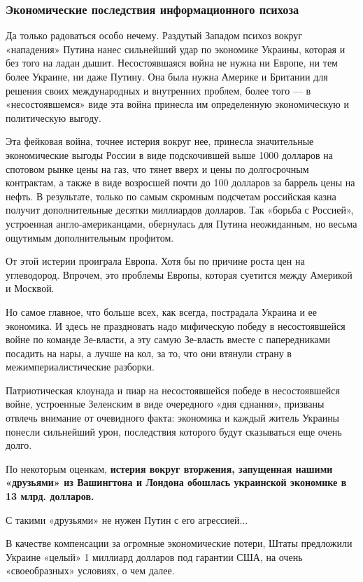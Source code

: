 
 
 
 
 

\subsubsection{Экономические последствия информационного психоза}

Да только радоваться особо нечему. Раздутый Западом психоз вокруг «нападения»
Путина нанес сильнейший удар по экономике Украины, которая и без того на ладан
дышит. Несостоявшаяся война не нужна ни Европе, ни тем более Украине, ни даже
Путину. Она была нужна Америке и Британии для решения своих международных и
внутренних проблем, более того — в «несостоявшемся» виде эта война принесла им
определенную экономическую и политическую выгоду.

Эта фейковая война, точнее истерия вокруг нее, принесла значительные
экономические выгоды России в виде подскочившей выше 1000 долларов на спотовом
рынке цены на газ, что тянет вверх и цены по долгосрочным контрактам, а также в
виде возросшей почти до 100 долларов за баррель цены на нефть. В результате,
только по самым скромным подсчетам российская казна получит дополнительные
десятки миллиардов долларов. Так «борьба с Россией», устроенная
англо-американцами, обернулась для Путина неожиданным, но весьма ощутимым
дополнительным профитом.

От этой истерии проиграла Европа. Хотя бы по причине роста цен на углеводород.
Впрочем, это проблемы Европы, которая суетится между Америкой и Москвой.

Но самое главное, что больше всех, как всегда, пострадала Украина и ее
экономика. И здесь не праздновать надо мифическую победу в несостоявшейся войне
по команде Зе-власти, а эту самую Зе-власть вместе с папередниками посадить на
нары, а лучше на кол, за то, что они втянули страну в межимпериалистические
разборки.

Патриотическая клоунада и пиар на несостоявшейся победе в несостоявшейся войне,
устроенные Зеленским в виде очередного «дня єднання», призваны отвлечь внимание
от очевидного факта: экономика и каждый житель Украины понесли сильнейший урон,
последствия которого будут сказываться еще очень долго.

По некоторым оценкам, \textbf{истерия вокруг вторжения, запущенная нашими «друзьями» из
Вашингтона и Лондона обошлась украинской экономике в 13 млрд. долларов.}

С такими «друзьями» не нужен Путин с его агрессией...

В качестве компенсации за огромные экономические потери, Штаты предложили
Украине «целый» 1 миллиард долларов под гарантии США, на очень «своеобразных»
условиях, о чем далее.

